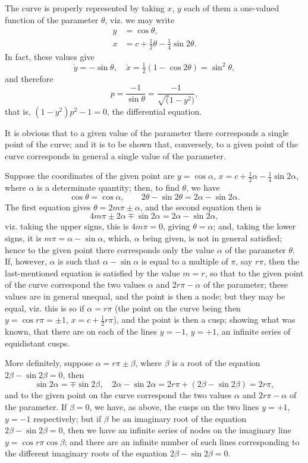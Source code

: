 \documentclass[12pt,a4paper]{article}
\theoremstyle{plain}
\theoremstyle{definition}
\theoremstyle{remark}
\begin{document}
The curve is properly represented by taking $x$, $y$ each of them a one-valued function of the parameter $\theta$, viz. we may write
\begin{align*}
y &= \cos\theta, \\
x &= c + \tfrac{1}{2}\theta - \tfrac{1}{4}\sin 2\theta.
\end{align*}
In fact, these values give
\[
\dot{y} = -\sin\theta, \quad \dot{x} = \tfrac{1}{2}(1 - \cos 2\theta) = \sin^2\theta,
\]
and therefore
\[
p = \frac{-1}{\sin\theta} = \frac{-1}{\surd(1-y^2)},
\]
that is, $(1-y^2)p^2 - 1 = 0$, the differential equation.

It is obvious that to a given value of the parameter there corresponds a single point of the curve; and it is to be shown that, conversely, to a given point of the curve corresponds in general a single value of the parameter.

Suppose the coordinates of the given point are $y = \cos\alpha$, $x = c + \frac{1}{2}\alpha - \frac{1}{4}\sin 2\alpha$, where $\alpha$ is a determinate quantity; then, to find $\theta$, we have
\[
\cos\theta = \cos\alpha, \qquad 2\theta - \sin 2\theta = 2\alpha - \sin 2\alpha.
\]
The first equation gives $\theta = 2m\pi \pm \alpha$, and the second equation then is
\[
4m\pi \pm 2\alpha \mp \sin 2\alpha = 2\alpha - \sin 2\alpha,
\]
viz. taking the upper signs, this is $4m\pi = 0$, giving $\theta = \alpha$; and, taking the lower signs, it is $m\pi = \alpha - \sin\alpha$, which, $\alpha$ being given, is not in general satisfied; hence to the given point there corresponds only the value $\alpha$ of the parameter $\theta$. If, however, $\alpha$ is such that $\alpha - \sin\alpha$ is equal to a multiple of $\pi$, say $r\pi$, then the last-mentioned equation is satisfied by the value $m = r$, so that to the given point of the curve correspond the two values $\alpha$ and $2r\pi - \alpha$ of the parameter; these values are in general unequal, and the point is then a node; but they may be equal, viz. this is so if $\alpha = r\pi$ (the point on the curve being then $y = \cos r\pi = \pm 1$, $x = c + \frac{1}{2}r\pi$), and the point is then a cusp; showing what was known, that there are on each of the lines $y = -1$, $y = +1$, an infinite series of equidistant cusps.

More definitely, suppose $\alpha = r\pi \pm \beta$, where $\beta$ is a root of the equation $2\beta - \sin 2\beta = 0$, then
\[
\sin 2\alpha = \mp \sin 2\beta, \quad 2\alpha - \sin 2\alpha = 2r\pi + (2\beta - \sin 2\beta) = 2r\pi,
\]
and to the given point on the curve correspond the two values $\alpha$ and $2r\pi - \alpha$ of the parameter. If $\beta = 0$, we have, as above, the cusps on the two lines $y = +1$, $y = -1$ respectively; but if $\beta$ be an imaginary root of the equation $2\beta - \sin 2\beta = 0$, then we have an infinite series of nodes on the imaginary line $y = \cos r\pi \cos\beta$; and there are an infinite number of such lines corresponding to the different imaginary roots of the equation $2\beta - \sin 2\beta = 0$.
\end{document}
